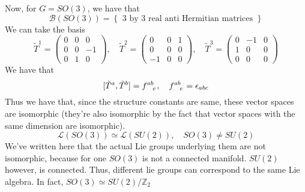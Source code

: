 Now, for $ G = SO ( 3) $, 
we have that 
 \[
	 \mathcal{ B  } ( SO ( 3) )  = \left\{  \text{ 3 by 3 real anti Hermitian matrices }  \right\} 
\]  We can take the basis
\[
	\tilde{ T }^ 1 = \begin{pmatrix} 0 & 0 & 0 \\ 0 & 0 & - 1 \\ 0 & 1 & 0  \end{pmatrix}, \quad \tilde { T }^ 2 = \begin{pmatrix} 0 & 0 & 1 \\ 0 & 0 & 0 \\ -1 & 0 & 0  \end{pmatrix}, \quad \tilde{ T } ^ 3 = \begin{pmatrix} 0 & -1 & 0 \\ 1 & 0 & 0 \\ 0 & 0 & 0  \end{pmatrix}   
\] We have that 
\[
[ \tilde{ T }^ a , \tilde { T  } ^ b ] =  f \indices{ ^ { ab } _ c }, \quad f \indices{ ^{ ab } _ c } = \epsilon_{ abc }  
\] Thus we have that, since the structure constants are same,
these vector spaces are isomorphic (they're also isomorphic 
by the fact that vector spaces with the same dimension are isomorphic). 
\[
	\mathcal{ L  } ( SO ( 3 )) \simeq \mathcal{ L } ( SU ( 2) ), \quad SO ( 3) \neq SU ( 2) 
\] We've written here that the actual Lie groups underlying them 
are not isomorphic, because for one $ SO ( 3) $ 
is not a connected manifold. $ SU ( 2) $ however, 
is connected. 
Thus, different lie groups can correspond to the same Lie algebra. In fact, $ SO ( 3) \simeq SU ( 2) / \mathbb{ Z }_2 $


\pagebreak
